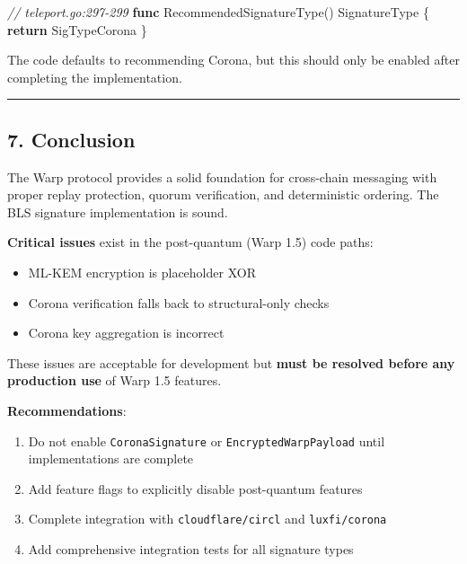 \documentclass[
]{article}
\newenvironment{Shaded}{}{}
\newcommand{\CommentTok}[1]{\textcolor[rgb]{0.38,0.63,0.69}{\textit{#1}}}
\newcommand{\ControlFlowTok}[1]{\textcolor[rgb]{0.00,0.44,0.13}{\textbf{#1}}}
\newcommand{\KeywordTok}[1]{\textcolor[rgb]{0.00,0.44,0.13}{\textbf{#1}}}
\newcommand{\NormalTok}[1]{#1}
\newcommand{\OperatorTok}[1]{\textcolor[rgb]{0.40,0.40,0.40}{#1}}
\providecommand{\tightlist}{%
  \setlength{\itemsep}{0pt}\setlength{\parskip}{0pt}}
\begin{document}
\begin{Shaded}
\begin{Highlighting}[]
\CommentTok{// teleport.go:297{-}299}
\KeywordTok{func}\NormalTok{ RecommendedSignatureType}\OperatorTok{()}\NormalTok{ SignatureType }\OperatorTok{\{}
    \ControlFlowTok{return}\NormalTok{ SigTypeCorona}
\OperatorTok{\}}
\end{Highlighting}
\end{Shaded}

The code defaults to recommending Corona, but this should only be
enabled after completing the implementation.

\begin{center}\rule{0.5\linewidth}{0.5pt}\end{center}

\subsection{7. Conclusion}\label{7-conclusion}

The Warp protocol provides a solid foundation for cross-chain messaging
with proper replay protection, quorum verification, and deterministic
ordering. The BLS signature implementation is sound.

\textbf{Critical issues} exist in the post-quantum (Warp 1.5) code
paths:

\begin{itemize}
\tightlist
\item
  ML-KEM encryption is placeholder XOR
\item
  Corona verification falls back to structural-only checks
\item
  Corona key aggregation is incorrect
\end{itemize}

These issues are acceptable for development but \textbf{must be resolved
before any production use} of Warp 1.5 features.

\textbf{Recommendations}:

\begin{enumerate}
\def\labelenumi{\arabic{enumi}.}
\tightlist
\item
  Do not enable \texttt{CoronaSignature} or
  \texttt{EncryptedWarpPayload} until implementations are complete
\item
  Add feature flags to explicitly disable post-quantum features
\item
  Complete integration with \texttt{cloudflare/circl} and
  \texttt{luxfi/corona}
\item
  Add comprehensive integration tests for all signature types
\end{enumerate}
\end{document}
